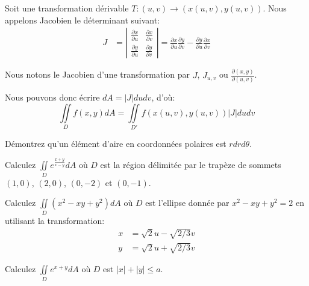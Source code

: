 \documentclass[]{book}
\theoremstyle{definition}
\theoremstyle{definition}
\theoremstyle{definition}
\theoremstyle{remark}
\let\BeginKnitrBlock\begin \let\EndKnitrBlock\end
\begin{document}
\BeginKnitrBlock{definition}[Jacobien]
\protect\hypertarget{def:unnamed-chunk-265}{}{\label{def:unnamed-chunk-265}
{} }Soit une transformation dérivable
\(T:(u,v)\rightarrow (x(u,v),y(u,v))\). Nous appelons Jacobien le
déterminant suivant: \begin{align*}
J&=\left|\begin{array}{cc}
\frac{\partial x}{\partial u} & \frac{\partial x}{\partial v} \\
\frac{\partial y}{\partial u} & \frac{\partial y}{\partial v}
\end{array}   \right|
=\frac{\partial x}{\partial u}\frac{\partial y}{\partial v}- \frac{\partial y}{\partial u} \frac{\partial x}{\partial v}
\end{align*}
\EndKnitrBlock{definition}

\BeginKnitrBlock{remark}
{}Nous notons le Jacobien d'une
transformation par \(J\), \(J_{u,v}\) ou
\(\frac{\partial (x,y)}{\partial (u,v)}\).
\EndKnitrBlock{remark}

Nous pouvons donc écrire \(dA=|J|dudv\), d'où:
\[\iint\limits_D f(x,y)dA=\iint\limits_{D'} f(x(u,v),y(u,v))|J|dudv\]

\BeginKnitrBlock{example}
\protect\hypertarget{exm:unnamed-chunk-267}{}{\label{exm:unnamed-chunk-267}
}Démontrez qu'un élément d'aire en coordonnées polaires est
\(rdrd\theta\).
\EndKnitrBlock{example}
\vspace*{5cm}

\BeginKnitrBlock{example}
\protect\hypertarget{exm:unnamed-chunk-268}{}{\label{exm:unnamed-chunk-268}
}Calculez \(\iint\limits_D e^{\tfrac{x+y}{x-y}}dA\) où \(D\) est la
région délimitée par le trapèze de sommets \((1,0)\), \((2,0)\),
\((0,-2)\) et \((0,-1)\).
\EndKnitrBlock{example}
\vspace*{10cm}

\BeginKnitrBlock{example}
\protect\hypertarget{exm:unnamed-chunk-269}{}{\label{exm:unnamed-chunk-269}
}Calculez \(\iint\limits_D (x^2-xy+y^2)dA\) où \(D\) est l'ellipse
donnée par \(x^2-xy+y^2=2\) en utilisant la transformation:
\begin{align*}
x &= \sqrt{2}u-\sqrt{2/3}v \\
y &= \sqrt{2}u+\sqrt{2/3}v 
\end{align*}
\EndKnitrBlock{example}
\vspace*{8cm}

\BeginKnitrBlock{example}
\protect\hypertarget{exm:unnamed-chunk-270}{}{\label{exm:unnamed-chunk-270}
}Calculez \(\iint\limits_D e^{x+y}dA\) où \(D\) est \(|x|+|y|\leq a\).
\EndKnitrBlock{example}
\vspace*{8cm}
\end{document}
